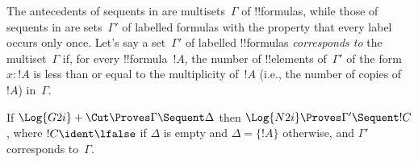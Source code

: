 \documentclass[../../../include/open-logic-section]{subfiles}
\begin{document}


The antecedents of sequents in  are multisets~$\Gamma$ of
!!{formula}s, while those of sequents in  are sets~$\Gamma'$
of labelled formulas with the property that every label occurs only
once. Let's say a set~$\Gamma'$ of labelled !!{formula}s
\emph{corresponds to} the multiset~$\Gamma$ if, for every
!!{formula}~$!A$, the number of !!{element}s of~$\Gamma'$ of the form
$x : !A$ is less than or equal to the multiplicity of~$!A$ (i.e., the
number of copies of~$!A$) in~$\Gamma$.

\begin{prop}
If $\Log{G2i} + \Cut \Proves \Gamma \Sequent \Delta$ then $\Log{N2i}
\Proves \Gamma' \Sequent !C$, where $!C \ident \lfalse$ if $\Delta$ is
empty and $\Delta = \{!A\}$ otherwise, and $\Gamma'$ corresponds
to~$\Gamma$.
\end{prop}
\end{document}
